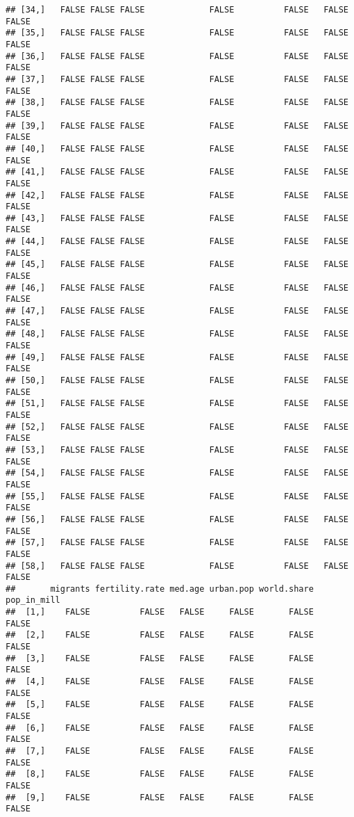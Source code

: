 \documentclass[
]{article}
\begin{document}
\begin{verbatim}
## [34,]   FALSE FALSE FALSE             FALSE          FALSE   FALSE FALSE
## [35,]   FALSE FALSE FALSE             FALSE          FALSE   FALSE FALSE
## [36,]   FALSE FALSE FALSE             FALSE          FALSE   FALSE FALSE
## [37,]   FALSE FALSE FALSE             FALSE          FALSE   FALSE FALSE
## [38,]   FALSE FALSE FALSE             FALSE          FALSE   FALSE FALSE
## [39,]   FALSE FALSE FALSE             FALSE          FALSE   FALSE FALSE
## [40,]   FALSE FALSE FALSE             FALSE          FALSE   FALSE FALSE
## [41,]   FALSE FALSE FALSE             FALSE          FALSE   FALSE FALSE
## [42,]   FALSE FALSE FALSE             FALSE          FALSE   FALSE FALSE
## [43,]   FALSE FALSE FALSE             FALSE          FALSE   FALSE FALSE
## [44,]   FALSE FALSE FALSE             FALSE          FALSE   FALSE FALSE
## [45,]   FALSE FALSE FALSE             FALSE          FALSE   FALSE FALSE
## [46,]   FALSE FALSE FALSE             FALSE          FALSE   FALSE FALSE
## [47,]   FALSE FALSE FALSE             FALSE          FALSE   FALSE FALSE
## [48,]   FALSE FALSE FALSE             FALSE          FALSE   FALSE FALSE
## [49,]   FALSE FALSE FALSE             FALSE          FALSE   FALSE FALSE
## [50,]   FALSE FALSE FALSE             FALSE          FALSE   FALSE FALSE
## [51,]   FALSE FALSE FALSE             FALSE          FALSE   FALSE FALSE
## [52,]   FALSE FALSE FALSE             FALSE          FALSE   FALSE FALSE
## [53,]   FALSE FALSE FALSE             FALSE          FALSE   FALSE FALSE
## [54,]   FALSE FALSE FALSE             FALSE          FALSE   FALSE FALSE
## [55,]   FALSE FALSE FALSE             FALSE          FALSE   FALSE FALSE
## [56,]   FALSE FALSE FALSE             FALSE          FALSE   FALSE FALSE
## [57,]   FALSE FALSE FALSE             FALSE          FALSE   FALSE FALSE
## [58,]   FALSE FALSE FALSE             FALSE          FALSE   FALSE FALSE
##       migrants fertility.rate med.age urban.pop world.share pop_in_mill
##  [1,]    FALSE          FALSE   FALSE     FALSE       FALSE       FALSE
##  [2,]    FALSE          FALSE   FALSE     FALSE       FALSE       FALSE
##  [3,]    FALSE          FALSE   FALSE     FALSE       FALSE       FALSE
##  [4,]    FALSE          FALSE   FALSE     FALSE       FALSE       FALSE
##  [5,]    FALSE          FALSE   FALSE     FALSE       FALSE       FALSE
##  [6,]    FALSE          FALSE   FALSE     FALSE       FALSE       FALSE
##  [7,]    FALSE          FALSE   FALSE     FALSE       FALSE       FALSE
##  [8,]    FALSE          FALSE   FALSE     FALSE       FALSE       FALSE
##  [9,]    FALSE          FALSE   FALSE     FALSE       FALSE       FALSE

\end{verbatim}
\end{document}
